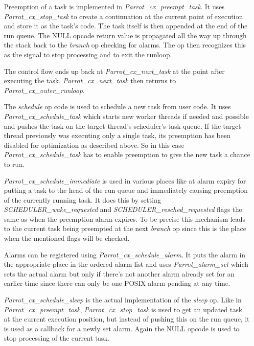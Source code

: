 \documentclass[bachelor,english]{hgbthesis}
\begin{document}
Preemption of a task is implemented in \textit{Parrot\_cx\_preempt\_task}. It uses \textit{Parrot\_cx\_stop\_task} to create a continuation at the current point of execution and store it as the task's code. The task itself is then appended at the end of the run queue. The NULL opcode return value is propagated all the way up through the stack back to the \textit{branch} op checking for alarms. The op then recognizes this as the signal to stop processing and to exit the runloop.

The control flow ends up back at \textit{Parrot\_cx\_next\_task} at the point after executing the task. \textit{Parrot\_cx\_next\_task} then returns to \textit{Parrot\_cx\_outer\_runloop}.

The \textit{schedule} op code is used to schedule a new task from user code. It uses \textit{Parrot\_cx\_schedule\_task} which starts new worker threads if needed and possible and pushes the task on the target thread's scheduler's task queue. If the target thread previously was executing only a single task, its preemption has been disabled for optimization as described above. So in this case \textit{Parrot\_cx\_schedule\_task} has to enable preemption to give the new task a chance to run.

\textit{Parrot\_cx\_schedule\_immediate} is used in various places like at alarm expiry for putting a task to the head of the run queue and immediately causing preemption of the currently running task. It does this by setting \textit{SCHEDULER\_wake\_requested} and \textit{SCHEDULER\_resched\_requested} flags the same as when the preemption alarm expires. To be precise this mechanism leads to the current task being preempted at the next \textit{branch} op since this is the place when the mentioned flags will be checked.

Alarms can be registered using \textit{Parrot\_cx\_schedule\_alarm}. It puts the alarm in the appropriate place in the ordered alarm list and uses \textit{Parrot\_alarm\_set} which sets the actual alarm but only if there's not another alarm already set for an earlier time since there can only be one POSIX alarm pending at any time.

\textit{Parrot\_cx\_schedule\_sleep} is the actual implementation of the \textit{sleep} op. Like in \textit{Parrot\_cx\_preempt\_task}, \textit{Parrot\_cx\_stop\_task} is used to get an updated task at the current execution position, but instead of pushing this on the run queue, it is used as a callback for a newly set alarm. Again the NULL opcode is used to stop processing of the current task.
\end{document}
